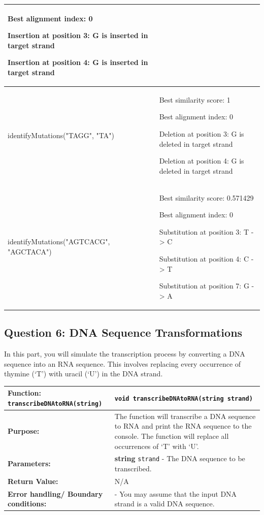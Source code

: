 \begin{sampleProject}
\begin{longtable}{|p{2.6in}|p{2.5in}|}
            Best alignment index: 0
            
            Insertion at position 3: G is inserted in target strand

            Insertion at position 4: G is inserted in target strand
            \\ \hline

        identifyMutations("TAGG", "TA")
            & 
            Best similarity score: 1
            
            Best alignment index: 0


            Deletion at position 3: G is deleted in target strand

            Deletion at position 4: G is deleted in target strand
            \\ \hline

        identifyMutations("AGTCACG", "AGCTACA")
            & 
            Best similarity score: 0.571429
            
            Best alignment index: 0
            
            Substitution at position 3: T -> C
            
            Substitution at position 4: C -> T
            
            Substitution at position 7: G -> A
            \\ \hline
    \end{longtable}
\end{sampleProject}

\subsection{Question 6: DNA Sequence Transformations}

In this part, you will simulate the transcription process by converting a DNA sequence into an RNA sequence. This involves replacing every occurrence of thymine (`T') with uracil (`U') in the DNA strand.

\begin{longtable}{|p{1.7in}|p{4.0in}|}
    \hline
    \textbf{Function:} \texttt{transcribeDNAtoRNA(string)}
        & 
        \texttt{void transcribeDNAtoRNA(string strand)} 
        \\ \hline
    
    \textbf{Purpose:} 
        & 
        The function will transcribe a DNA sequence to RNA and print the RNA sequence to the console. The function will replace all occurrences of `T' with `U'.
        \\ \hline
    
    \textbf{Parameters:} 
        & 
        \textbf{string} \texttt{strand} - The DNA sequence to be transcribed.
        \\ \hline
    
    \textbf{Return Value:} 
        & 
        N/A
        \\ \hline
    \textbf{Error handling/ Boundary conditions:}
        &
        - You may assume that the input DNA strand is a valid DNA sequence.
        \\ \hline
\end{longtable}

